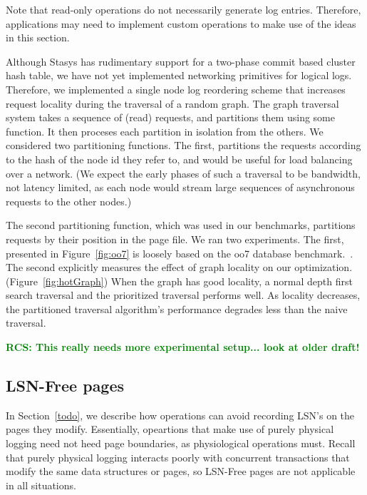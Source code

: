 \documentclass[letterpaper,twocolumn,10pt]{article}
\newcommand{\yad}{Stasys\xspace}
\newcommand{\rcs}[1]{\textcolor{green}{\bf RCS: #1}}
\begin{document}
Note that read-only operations do not necessarily generate log
entries.  Therefore, applications may need to implement custom
operations to make use of the ideas in this section.

Although \yad has rudimentary support for a two-phase commit based
cluster hash table, we have not yet implemented networking primitives for logical logs.
Therefore, we implemented a single node log reordering scheme that increases request locality
during the traversal of a random graph.  The graph traversal system
takes a sequence of (read) requests, and partitions them using some
function.  It then proceses each partition in isolation from the
others.  We considered two partitioning functions.  The first, partitions the
requests according to the hash of the node id they refer to, and would be useful for load balancing over a network.
(We expect the early phases of such a traversal to be bandwidth, not
latency limited, as each node would stream large sequences of
asynchronous requests to the other nodes.) 

The second partitioning function, which was used in our benchmarks,
partitions requests by their position in the page
file.  We ran two experiments.  The first, presented in Figure~\ref{fig:oo7} is loosely based on the oo7 database benchmark.~\cite{oo7}.  The second explicitly measures the effect of graph locality on our optimization. (Figure~\ref{fig:hotGraph})  When the graph has good locality, a normal depth first search
traversal and the prioritized traversal performs well.  As locality
decreases, the partitioned traversal algorithm's performance degrades
less than the naive traversal.

\rcs{ This really needs more experimental setup... look at older draft! }

\subsection{LSN-Free pages}
\label{sec:zeroCopy}
In Section~\ref{todo}, we describe how operations can avoid recording
LSN's on the pages they modify.  Essentially, opeartions that make use
of purely physical logging need not heed page boundaries, as
physiological operations must.  Recall that purely physical logging
interacts poorly with concurrent transactions that modify the same
data structures or pages, so LSN-Free pages are not applicable in all
situations.
\end{document}
